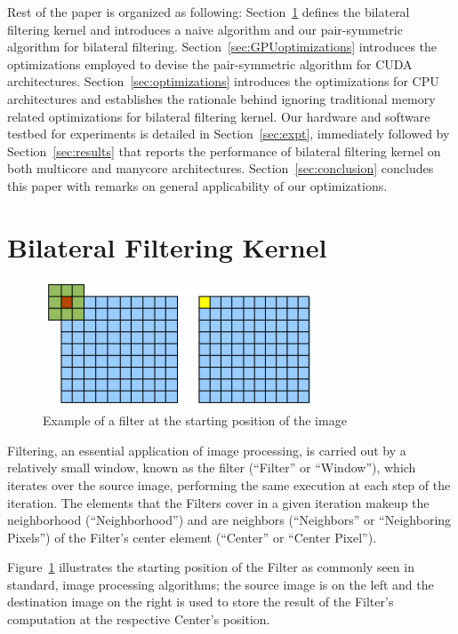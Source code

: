 \documentclass{IEEEtran}
\begin{document}
Rest of the paper is organized as following: Section~\ref{sec:stencil} defines the bilateral filtering kernel and introduces a naive algorithm and our pair-symmetric algorithm for bilateral filtering. Section~\ref{sec:GPUoptimizations} introduces the optimizations employed to devise the pair-symmetric algorithm for CUDA architectures. Section~\ref{sec:optimizations} introduces the optimizations for CPU architectures and establishes the rationale behind ignoring traditional memory related optimizations for bilateral filtering kernel. Our hardware and software testbed for experiments is detailed in Section~\ref{sec:expt}, immediately followed by Section~\ref{sec:results} that reports the performance of bilateral filtering kernel on both multicore and manycore architectures. Section~\ref{sec:conclusion} concludes this paper with remarks on general applicability of our optimizations.

\section{Bilateral Filtering Kernel}
\label{sec:stencil} 

\begin{figure}[h!]
\centering 
\includegraphics[width=3.2in]{images/filter} 
\caption{Example of a filter at the starting position of the image}
\label{fig:filter} 
\end{figure}

Filtering, an essential application of image processing, is carried out by a relatively small window, known as the filter (``Filter'' or ``Window''), which iterates over the source image, performing the same execution at each step of the iteration. The elements that the Filters cover in a given iteration makeup the neighborhood (``Neighborhood'') and are neighbors (``Neighbors'' or ``Neighboring Pixels'') of the Filter's center element (``Center'' or ``Center Pixel''). 

Figure~\ref{fig:filter} illustrates the starting position of the Filter as commonly seen in standard, image processing algorithms; the source image is on the left and the destination image on the right is used to store the result of the Filter's computation at the respective Center's position.
\end{document}
